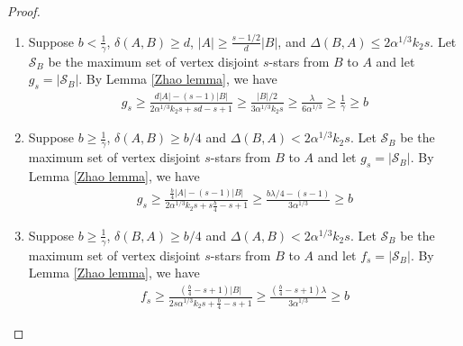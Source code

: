 \documentclass[oneside,12pt]{memoir}
\newtheorem{lemma}[theorem]{Lemma}
\begin{document}
\begin{proof}
\begin{enumerate}
\item Suppose $b<\frac{1}{\gamma}$, $\delta(A,B)\geq d$, $|A|\geq \frac{s-1/2}{d}|B|$, and $\Delta(B,A)\leq 2\alpha^{1/3}k_2s$.  Let $\mathcal{S}_B$ be the maximum set of vertex disjoint $s$-stars from $B$ to $A$ and let $g_s=|\mathcal{S}_B|$.  By Lemma \ref{Zhao lemma}, we have
\begin{align*}
g_s\geq \frac{d|A|-(s-1)|B|}{2\alpha^{1/3}k_2s+sd-s+1}\geq \frac{|B|/2}{3\alpha^{1/3}k_2s}
\geq \frac{\lambda}{6\alpha^{1/3}}
\geq \frac{1}{\gamma}
\geq b
\end{align*}

\item Suppose $b\geq \frac{1}{\gamma}$, $\delta(A,B)\geq b/4$ and $\Delta(B,A)<2\alpha^{1/3}k_2s$.  Let $\mathcal{S}_B$ be the maximum set of vertex disjoint $s$-stars from $B$ to $A$ and let $g_s=|\mathcal{S}_B|$.  By Lemma \ref{Zhao lemma}, we have
\begin{align*}
g_s\geq \frac{\frac{b}{4}|A|-(s-1)|B|}{2\alpha^{1/3}k_2s+s\frac{b}{4}-s+1}\geq \frac{b\lambda/4-(s-1)}{3\alpha^{1/3}}\geq b
\end{align*}


\item Suppose $b\geq \frac{1}{\gamma}$, $\delta(B,A)\geq b/4$ and $\Delta(A,B)<2\alpha^{1/3}k_2s$.  Let $\mathcal{S}_B$ be the maximum set of vertex disjoint $s$-stars from $B$ to $A$ and let $f_s=|\mathcal{S}_B|$.  By Lemma \ref{Zhao lemma}, we have
\begin{align*}
f_s\geq \frac{(\frac{b}{4}-s+1)|B|}{2s\alpha^{1/3}k_2s+\frac{b}{4}-s+1}\geq \frac{(\frac{b}{4}-s+1)\lambda}{3\alpha^{1/3}}\geq b
\end{align*}

\end{enumerate}

\end{proof}

\end{document}
